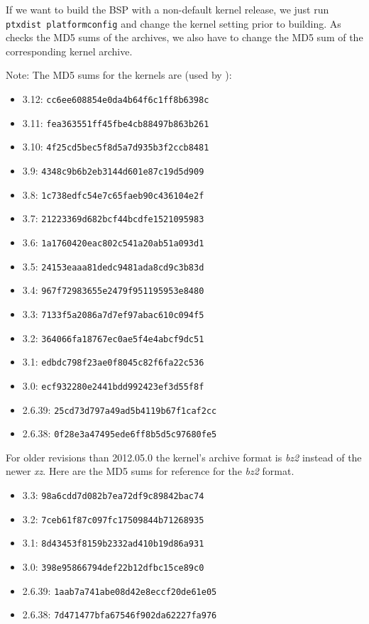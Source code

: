 If we want to build the BSP with a non-default kernel release, we just run
\texttt{ptxdist platformconfig} and change the kernel setting prior to building.
As \ptxdist{} checks the MD5 sums of the archives, we also have to change the
MD5 sum of the corresponding kernel archive.

Note: The MD5 sums for the kernels are (used by \ptxdist{}):
\begin{itemize}
	\item 3.12: \texttt{cc6ee608854e0da4b64f6c1ff8b6398c}
	\item 3.11: \texttt{fea363551ff45fbe4cb88497b863b261}
	\item 3.10: \texttt{4f25cd5bec5f8d5a7d935b3f2ccb8481}
	\item 3.9: \texttt{4348c9b6b2eb3144d601e87c19d5d909}
	\item 3.8: \texttt{1c738edfc54e7c65faeb90c436104e2f}
	\item 3.7: \texttt{21223369d682bcf44bcdfe1521095983}
	\item 3.6: \texttt{1a1760420eac802c541a20ab51a093d1}
	\item 3.5: \texttt{24153eaaa81dedc9481ada8cd9c3b83d}
	\item 3.4: \texttt{967f72983655e2479f951195953e8480}
	\item 3.3: \texttt{7133f5a2086a7d7ef97abac610c094f5}
	\item 3.2: \texttt{364066fa18767ec0ae5f4e4abcf9dc51}
	\item 3.1: \texttt{edbdc798f23ae0f8045c82f6fa22c536}
	\item 3.0: \texttt{ecf932280e2441bdd992423ef3d55f8f}
	\item 2.6.39: \texttt{25cd73d797a49ad5b4119b67f1caf2cc}
	\item 2.6.38: \texttt{0f28e3a47495ede6ff8b5d5c97680fe5}
\end{itemize}

For older \ptxdist{} revisions than 2012.05.0 the kernel's archive format
is \textit{bz2} instead of the newer \textit{xz}. Here are the MD5 sums
for reference for the \textit{bz2} format.

\begin{itemize}
	\item 3.3: \texttt{98a6cdd7d082b7ea72df9c89842bac74}
	\item 3.2: \texttt{7ceb61f87c097fc17509844b71268935}
	\item 3.1: \texttt{8d43453f8159b2332ad410b19d86a931}
	\item 3.0: \texttt{398e95866794def22b12dfbc15ce89c0}
	\item 2.6.39: \texttt{1aab7a741abe08d42e8eccf20de61e05}
	\item 2.6.38: \texttt{7d471477bfa67546f902da62227fa976}
\end{itemize}

